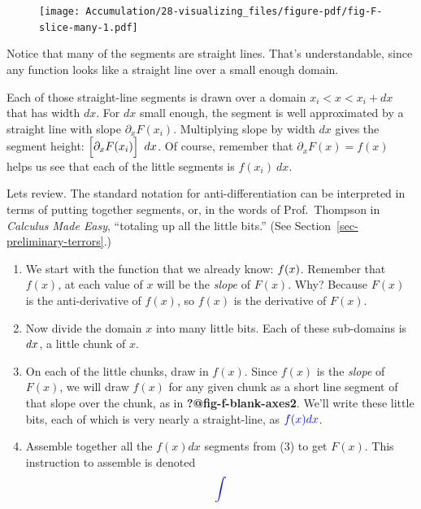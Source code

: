\documentclass[
  letterpaper,
  DIV=11,
  numbers=noendperiod,
  oneside]{scrreprt}
\begin{document}
\begin{figure}


{\centering \texttt{[image: Accumulation/28-visualizing\_files/figure-pdf/fig-F-slice-many-1.pdf]}

}

\end{figure}

Notice that many of the segments are straight lines. That's
understandable, since any function looks like a straight line over a
small enough domain.

Each of those straight-line segments is drawn over a domain
\(x_i < x < x_i+dx\) that has width \(dx\). For \(dx\) small enough, the
segment is well approximated by a straight line with slope
\(\partial_x F(x_i)\). Multiplying slope by width \(dx\) gives the
segment height: \(\left[{\large\strut}\partial_x F(x_i)\right]\ dx\). Of
course, remember that \(\partial_x F(x) = f(x)\) helps us see that each
of the little segments is \(f(x_i)\ dx\).

Lets review. The standard notation for anti-differentiation can be
interpreted in terms of putting together segments, or, in the words of
Prof.~Thompson in \emph{Calculus Made Easy}, ``totaling up all the
little bits.'' (See Section~\ref{sec-preliminary-terrors}.)

\begin{enumerate}
\def\labelenumi{\arabic{enumi}.}
\item
  We start with the function that we already know: \(\large f(x)\).
  Remember that \(f(x)\), at each value of \(x\) will be the
  \emph{slope} of \(F(x)\). Why? Because \(F(x)\) is the anti-derivative
  of \(f(x)\), so \(f(x)\) is the derivative of \(F(x)\).
\item
  Now divide the domain \(x\) into many little bits. Each of these
  sub-domains is \(\large dx\), a little chunk of \(x\).
\item
  On each of the little chunks, draw in \(f(x)\). Since \(f(x)\) is the
  \emph{slope} of \(F(x)\), we will draw \(f(x)\) for any given chunk as
  a short line segment of that slope over the chunk, as in
  \textbf{?@fig-f-blank-axes2}. We'll write these little bits, each of
  which is very nearly a straight-line, as
  \(\large\color{blue}{f(x) dx}\).
\item
  Assemble together all the \(f(x)dx\) segments from (3) to get
  \(F(x)\). This instruction to assemble is denoted
  \[\Large \color{blue}\int\]
\end{enumerate}
\end{document}
